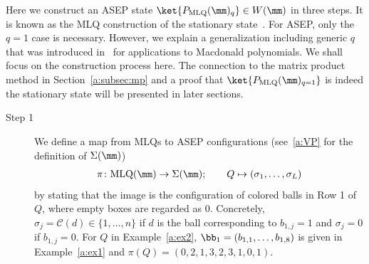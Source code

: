 Here we construct an ASEP state  $\ket{P_{\text{MLQ}}(\mm)_q} \in W(\mm)$
in three steps.
It is known as the MLQ construction of the stationary state~\cite{CMW,Martin20}.
For ASEP, only the $q = 1$ case is necessary.
However, we explain a generalization including generic $q$ that was introduced in~\cite{CMW} for applications to Macdonald polynomials.
We shall focus on the construction process here.
The connection to the matrix product method in Section~\ref{a:subsec:mp} and a proof that 
$\ket{P_{\text{MLQ}}(\mm)_{q=1}}$ is indeed the stationary state will be presented in later sections.
\begin{description}
\item[Step 1]
We define a map from MLQs to ASEP configurations (see~\eqref{a:VP} for the 
definition of $\Sigma(\mm)$)
\begin{align}\label{a:pi}
\pi\colon \text{MLQ}(\mm) \rightarrow \Sigma(\mm); \qquad Q \mapsto (\sigma_1,\ldots, \sigma_L)
\end{align}
by stating that the image is the configuration of colored balls in Row 1 of $Q$, where 
empty boxes are regarded as 0.
Concretely, $\sigma_j = \mathcal{C}(d) \in \{1,\ldots, n\}$ if $d$ is 
the ball corresponding to $b_{1,j} = 1$ and 
$\sigma_j = 0$ if $b_{1,j} = 0$. 
For $Q$ in Example~\ref{a:ex2}, 
$\bb_1=(b_{1,1},\ldots, b_{1,8})$ 
is given in Example~\ref{a:ex1} and $\pi(Q) = (0,2,1,3,2,3,1,0,1)$.


\end{description}
